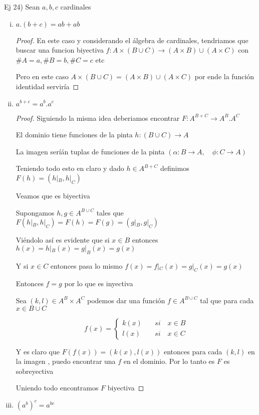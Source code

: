 \documentclass[12pt]{article}
\newcommand{\ra}{\rightarrow}
\theoremstyle{definition}
\begin{document}
\noindent Ej 24) Sean $a,b,c$ cardinales
\begin{enumerate}[i.]
  \item $a.(b+c) = ab + ab$
    \begin{proof}
      En este caso y considerando el álgebra de cardinales, tendriamos que buscar una funcion biyectiva $f: A \times (B \cup C) \ra (A \times B) \cup (A \times C)$ con $\# A = a, \# B = b, \# C = c$ etc 

      Pero en este caso $A \times (B \cup C) = (A \times B) \cup (A \times C)$ por ende la función identidad serviría
    \end{proof}
  \newpage
  \item $a^{b + c} = a^b.a^c$
 
    \begin{proof}
      Siguiendo la misma idea deberiamos encontrar $F: A^{B + C} \ra A^B.A^C$

      El dominio tiene funciones de la pinta $h:(B \cup C) \ra A$

      La imagen seríán tuplas de funciones de la pinta $(\alpha : B \ra A , \quad \phi : C \ra A)$

      Teniendo todo esto en claro y dado $h \in A^{B + C}$ definimos $F(h) = (h|_{B},h|_{C})$

      Veamos que es biyectiva

      Supongamos $h,g \in A^{B \cup C}$ tales que $F(h|_{B},h|_{C}) = F(h) = F(g) = (g|_{B},g|_{C})$ 

      Viéndolo así es evidente que si $x \in B$ entonces $h(x) = h|_{B}(x) = g|_{B}(x) = g(x)$

      Y si $x \in C$ entonces pasa lo mismo $f(x) = f|_{C}(x) = g|_{C}(x) = g(x)$

      Entonces $f = g$ por lo que es inyectiva

      Sea $(k,l) \in A^B \times A^C$ podemos dar una función $f \in A^{B \cup C}$ tal que para cada $x \in B \cup C$

$$
f(x) = \left\{
        \begin{array}{ll}
	  k(x)  & \quad si \quad x \in B \\
	l(x)  & \quad si \quad x \in C 
        \end{array}
    \right.
$$

Y es claro que $F(f(x)) = (k(x),l(x))$ entonces para cada $(k,l)$ en la imagen , puedo encontrar una $f$ en el dominio. Por lo tanto es $F$ es sobreyectiva 

Uniendo todo encontramos $F$ biyectiva
    \end{proof}
  \item $(a^b)^c = a^{bc}$


\end{enumerate}
\end{document}
